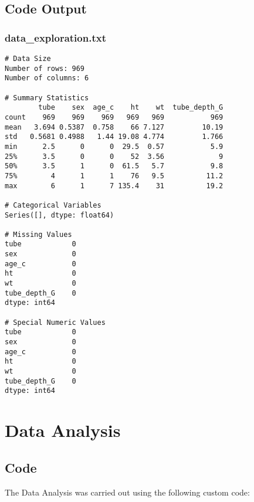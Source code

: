 \documentclass[11pt]{article}
\begin{document}
\subsection{Code Output}

\subsubsection*{data\_exploration.txt}

\begin{Verbatim}[tabsize=4]
# Data Size
Number of rows: 969
Number of columns: 6

# Summary Statistics
        tube    sex  age_c    ht    wt  tube_depth_G
count    969    969    969   969   969           969
mean   3.694 0.5387  0.758    66 7.127         10.19
std   0.5681 0.4988   1.44 19.08 4.774         1.766
min      2.5      0      0  29.5  0.57           5.9
25%      3.5      0      0    52  3.56             9
50%      3.5      1      0  61.5   5.7           9.8
75%        4      1      1    76   9.5          11.2
max        6      1      7 135.4    31          19.2

# Categorical Variables
Series([], dtype: float64)

# Missing Values
tube            0
sex             0
age_c           0
ht              0
wt              0
tube_depth_G    0
dtype: int64

# Special Numeric Values
tube            0
sex             0
age_c           0
ht              0
wt              0
tube_depth_G    0
dtype: int64

\end{Verbatim}

\section{Data Analysis}
\subsection{{Code}}
The Data Analysis was carried out using the following custom code:
\end{document}
